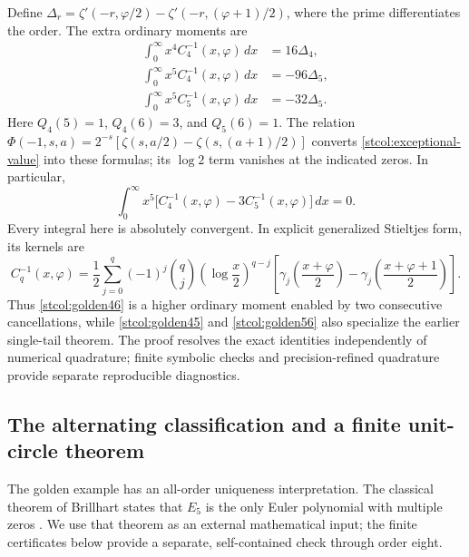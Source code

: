 Define
$\Delta_r=\zeta'(-r,\varphi/2)-\zeta'(-r,(\varphi+1)/2)$,
where the prime differentiates the order.  The extra ordinary moments are
\begin{align}
 \int_0^\infty x^4 C_4^{-1}(x,\varphi)\,dx
     &=16\Delta_4,\label{stcol:golden45}\\
 \int_0^\infty x^5 C_4^{-1}(x,\varphi)\,dx
     &=-96\Delta_5,\label{stcol:golden46}\\
 \int_0^\infty x^5 C_5^{-1}(x,\varphi)\,dx
     &=-32\Delta_5.\label{stcol:golden56}
\end{align}
Here $Q_4(5)=1$, $Q_4(6)=3$, and $Q_5(6)=1$.
The relation
$\Phi(-1,s,a)=2^{-s}[\zeta(s,a/2)-\zeta(s,(a+1)/2)]$
converts \eqref{stcol:exceptional-value} into these formulas; its
$\log2$ term vanishes at the indicated zeros.  In particular,
\begin{equation}\label{stcol:golden-vanishing}
 \int_0^\infty x^5
       \bigl[C_4^{-1}(x,\varphi)-3C_5^{-1}(x,\varphi)\bigr]\,dx=0.
\end{equation}
Every integral here is absolutely convergent.  In explicit generalized
Stieltjes form, its kernels are
\begin{equation}\label{stcol:golden-stieltjes}
 C_q^{-1}(x,\varphi)=\frac12\sum_{j=0}^q(-1)^j\binom qj
     \left(\log\frac x2\right)^{q-j}
     \left[\gamma_j\left(\frac{x+\varphi}{2}\right)
            -\gamma_j\left(\frac{x+\varphi+1}{2}\right)\right].
\end{equation}
Thus \eqref{stcol:golden46} is a higher ordinary moment enabled by two
consecutive cancellations, while \eqref{stcol:golden45} and
\eqref{stcol:golden56} also specialize the earlier single-tail theorem.
The proof resolves the exact identities independently of numerical
quadrature; finite symbolic checks and precision-refined quadrature
provide separate reproducible diagnostics.

\subsection{The alternating classification and a finite unit-circle theorem}

The golden example has an all-order uniqueness interpretation.  The
classical theorem of Brillhart states that $E_5$ is the only Euler
polynomial with multiple zeros \cite{stcol:Brillhart}.  We use that
theorem as an external mathematical input; the finite certificates below
provide a separate, self-contained check through order eight.


